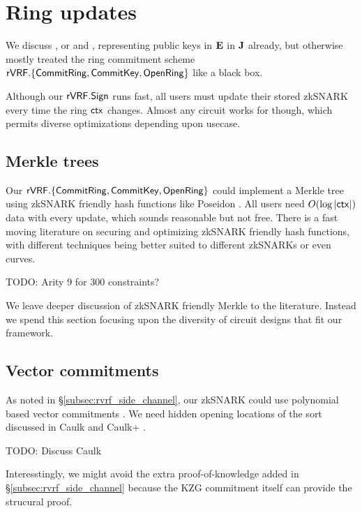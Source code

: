 \section{Ring updates}
\label{sec:ring_updates}

We discuss \pifast, or \pisk and \pipk, representing public keys
 in ${\mathbf{E}}$ in ${\mathbf{J}}$ already,
but otherwise mostly treated the ring commitment scheme
${\mathsf{rVRF}}.\{ {\mathsf{CommitRing}}, {\mathsf{CommitKey}}, {\mathsf{OpenRing}} \}$ like a black box.

Although our ${\mathsf{rVRF}}.{\mathsf{Sign}}$ runs fast, all users must update their
stored zkSNARK \pipk every time the ring $\mathsf{ctx}$ changes.
Almost any circuit works for \pipk though,
 which permits diverse optimizations depending upon usecase.


\subsection{Merkle trees} %

Our ${\mathsf{rVRF}}.\{ {\mathsf{CommitRing}}, {\mathsf{CommitKey}}, {\mathsf{OpenRing}} \}$ could implement a
Merkle tree using zkSNARK friendly hash functions like Poseidon \cite{poseidon}.
%
All users need $O(\log |\mathsf{ctx}|)$ data with every update, which sounds
reasonable but not free.  There is a fast moving literature on securing
and optimizing zkSNARK friendly hash functions, with different techniques
being better suited to different zkSNARKs or even curves.

TODO: Arity 9 for 300 constraints?   %

We leave deeper discussion of zkSNARK friendly Merkle to the literature.
Instead we spend this section focusing upon the diversity of circuit
designs that fit our framework.


\subsection{Vector commitments}

As noted in \S\ref{subsec:rvrf_side_channel}, our zkSNARK \pipk could use
polynomial based vector commitments \cite{KZG}. %
We need hidden opening locations of the sort discussed in Caulk \cite{caulk} and Caulk+ \cite{caulk+}.

TODO: Discuss Caulk

Interesstingly, we might avoid the extra proof-of-knowledge added
in \S\ref{subsec:rvrf_side_channel} because the KZG commitment itself
can provide the strucural proof.

